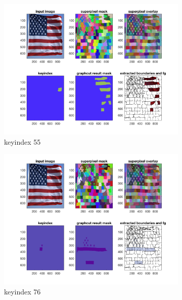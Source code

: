 \begin{figure}[htbp]
\begin{subfigure}[t]{0.49\textwidth}
        \includegraphics[width=\textwidth]{hw5/flag6.png}
		\caption{keyindex 55}\label{fig:22c}
    \end{subfigure}
    \begin{subfigure}[t]{0.49\textwidth}
        \centering
        \includegraphics[width=\textwidth]{hw5/flag3.png}
		\caption{keyindex 76}\label{fig:22d}
    \end{subfigure}
    \begin{subfigure}[t]{0.49\textwidth}
	    \centering

\end{subfigure}
\end{figure}
